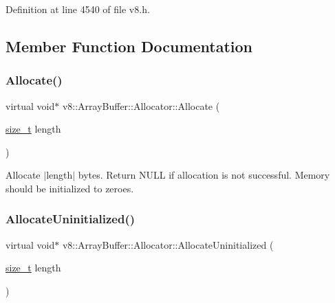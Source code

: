 Definition at line 4540 of file v8.\+h.



\subsection{Member Function Documentation}
\mbox{\label{classv8_1_1ArrayBuffer_1_1Allocator_a106b0d80120ed04fe9b9675e96f0340b}} 
\subsubsection{\texorpdfstring{Allocate()}{Allocate()}}
{\footnotesize\ttfamily virtual void$\ast$ v8\+::\+Array\+Buffer\+::\+Allocator\+::\+Allocate (\begin{DoxyParamCaption}\item[{\mbox{\hyperlink{classsize__t}{size\+\_\+t}}}]{length }\end{DoxyParamCaption})\hspace{0.3cm}{\ttfamily [pure virtual]}}

Allocate $\vert$length$\vert$ bytes. Return N\+U\+LL if allocation is not successful. Memory should be initialized to zeroes. \mbox{\label{classv8_1_1ArrayBuffer_1_1Allocator_a92b2d5c0a826d3c435e12f3ee178f37a}} 
\subsubsection{\texorpdfstring{Allocate\+Uninitialized()}{AllocateUninitialized()}}
{\footnotesize\ttfamily virtual void$\ast$ v8\+::\+Array\+Buffer\+::\+Allocator\+::\+Allocate\+Uninitialized (\begin{DoxyParamCaption}\item[{\mbox{\hyperlink{classsize__t}{size\+\_\+t}}}]{length }\end{DoxyParamCaption})\hspace{0.3cm}{\ttfamily [pure virtual]}}


